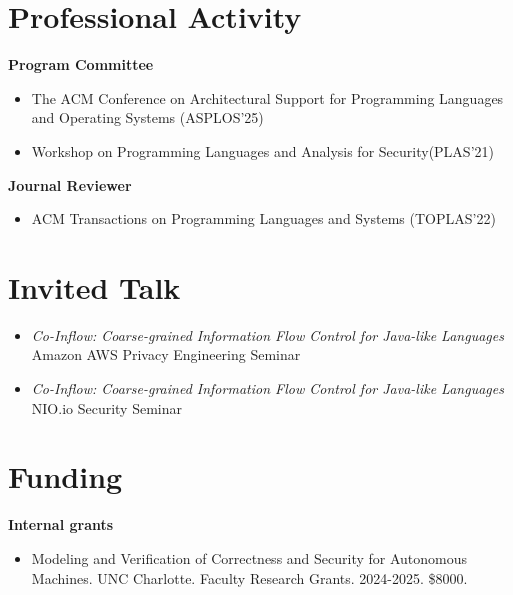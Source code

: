 \documentclass[11pt]{article}
\begin{document}
\section{Professional Activity}
\textbf{Program Committee}
\begin{itemize}
  \item The ACM Conference on Architectural Support for Programming Languages and Operating Systems (ASPLOS'25)
  \item Workshop on Programming Languages and Analysis for Security(PLAS'21)
\end{itemize}

\textbf{Journal Reviewer}
\begin{itemize}
\item  ACM Transactions on Programming Languages and Systems (TOPLAS'22)
\end{itemize}

\section{Invited Talk}


\begin{itemize}
\item \emph{Co-Inflow: Coarse-grained Information Flow Control for Java-like Languages} \\
  Amazon AWS Privacy Engineering Seminar
  

\item   \emph{Co-Inflow: Coarse-grained Information Flow Control for Java-like Languages} \\
  NIO.io Security Seminar 

\end{itemize}


\section{Funding}

\textbf{Internal grants}
\begin{itemize}
  \item Modeling and Verification of Correctness and Security for Autonomous Machines. UNC Charlotte. Faculty Research Grants. 2024-2025. \$8000. 
\end{itemize}

\end{document}

